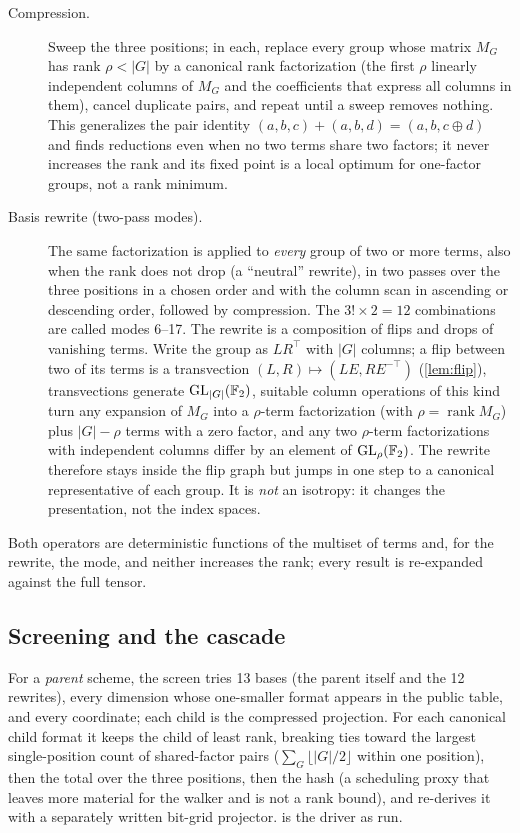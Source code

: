 \begin{description}
\item[Compression.] Sweep the three positions; in each, replace every group whose matrix $M_G$ has rank $\rho<|G|$ by a canonical rank factorization (the first $\rho$ linearly independent columns of $M_G$ and the coefficients that express all columns in them),
cancel duplicate pairs, and repeat until a sweep removes nothing. This generalizes the pair identity $(a,b,c)+(a,b,d)=(a,b,c\oplus d)$ and finds reductions even when no two terms share two factors; it never increases the rank and its fixed point
is a local optimum for one-factor groups, not a rank minimum.
\item[Basis rewrite (two-pass modes).] The same factorization is applied to \emph{every} group of two or more terms, also when the rank does not drop (a ``neutral'' rewrite), in two passes over the three positions in a chosen order and with the column scan in ascending
or descending order, followed by compression. The $3!\times2=12$ combinations are called modes 6--17. The rewrite is a composition of flips and drops of vanishing terms. Write the group as $LR^{\top}$ with $|G|$ columns; a flip between two of its terms is a transvection $(L,R)\mapsto(LE,RE^{-\top})$ (\cref{lem:flip}), transvections generate $\mathrm{GL}_{|G|}({\mathbb{F}_2})$, suitable column operations of this kind turn any expansion of $M_G$ into a $\rho$-term factorization (with $\rho=\operatorname{rank}M_G$) plus $|G|-\rho$ terms with a zero factor, and any two $\rho$-term factorizations with independent columns differ by an element of $\mathrm{GL}_\rho({\mathbb{F}_2})$.
The rewrite therefore stays inside the flip graph but jumps in one step to a canonical representative of each group. It is \emph{not} an isotropy: it changes the presentation, not the index spaces.
\end{description}
Both operators are deterministic functions of the multiset of terms and, for the rewrite, the mode, and neither increases the rank; every result is re-expanded against the full tensor.

\subsection{Screening and the cascade}\label{sec:cascade}
For a \emph{parent} scheme, the screen tries 13 bases (the parent itself and the 12 rewrites), every dimension whose one-smaller format appears in the public table, and every coordinate; each child is the compressed projection.
For each canonical child format it keeps the child of least rank, breaking ties toward the largest single-position count of shared-factor pairs ($\sum_G\lfloor|G|/2\rfloor$ within one position), then the total over the three positions, then the hash (a scheduling proxy that leaves more material for the walker and is not a rank bound), and re-derives it with a separately written bit-grid projector.
 is the driver as run.

